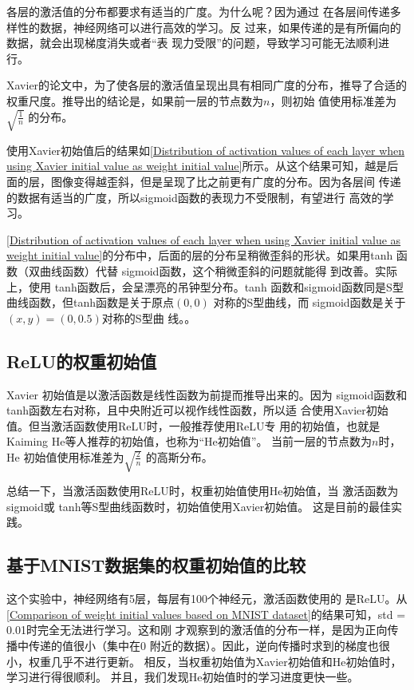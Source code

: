 \begin{tcolorbox}
    各层的激活值的分布都要求有适当的广度。为什么呢？因为通过
    在各层间传递多样性的数据，神经网络可以进行高效的学习。反
    过来，如果传递的是有所偏向的数据，就会出现梯度消失或者“表
    现力受限”的问题，导致学习可能无法顺利进行。
\end{tcolorbox}

Xavier的论文中，为了使各层的激活值呈现出具有相同广度的分布，推导了合适的权重尺度。推导出的结论是，如果前一层的节点数为$n$，则初始
值使用标准差为$\sqrt{\frac{1}{n}}$
的分布。


使用Xavier初始值后的结果如\autoref{Distribution of activation values of each layer when using Xavier initial value as weight initial value}所示。从这个结果可知，越是后
面的层，图像变得越歪斜，但是呈现了比之前更有广度的分布。因为各层间
传递的数据有适当的广度，所以sigmoid函数的表现力不受限制，有望进行
高效的学习。

\begin{tcolorbox}
    \autoref{Distribution of activation values of each layer when using Xavier initial value as weight initial value}的分布中，后面的层的分布呈稍微歪斜的形状。如果用tanh
    函数（双曲线函数）代替 sigmoid函数，这个稍微歪斜的问题就能得
    到改善。实际上，使用 tanh函数后，会呈漂亮的吊钟型分布。tanh
    函数和sigmoid函数同是S型曲线函数，但tanh函数是关于原点$(0, 0)$
    对称的S型曲线，而 sigmoid函数是关于$(x, y)=(0, 0.5)$对称的S型曲
    线。。
\end{tcolorbox}


\subsection{ReLU的权重初始值}
Xavier 初始值是以激活函数是线性函数为前提而推导出来的。因为
sigmoid函数和 tanh函数左右对称，且中央附近可以视作线性函数，所以适
合使用Xavier初始值。但当激活函数使用ReLU时，一般推荐使用ReLU专
用的初始值，也就是Kaiming He等人推荐的初始值，也称为“He初始值”。
当前一层的节点数为$n$时，He 初始值使用标准差为$\sqrt{\frac{2}{n}}$
的高斯分布。

总结一下，当激活函数使用ReLU时，权重初始值使用He初始值，当
激活函数为 sigmoid或 tanh等S型曲线函数时，初始值使用Xavier初始值。
这是目前的最佳实践。
\subsection{基于MNIST数据集的权重初始值的比较}
这个实验中，神经网络有5层，每层有100个神经元，激活函数使用的
是ReLU。从\autoref{Comparison of weight initial values based on MNIST dataset}的结果可知，std = 0.01时完全无法进行学习。这和刚
才观察到的激活值的分布一样，是因为正向传播中传递的值很小（集中在0
附近的数据）。因此，逆向传播时求到的梯度也很小，权重几乎不进行更新。
相反，当权重初始值为Xavier初始值和He初始值时，学习进行得很顺利。
并且，我们发现He初始值时的学习进度更快一些。
